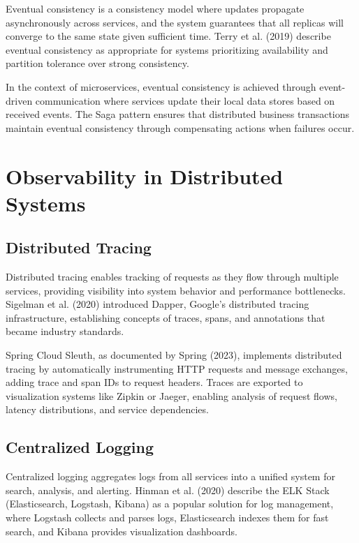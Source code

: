 Eventual consistency is a consistency model where updates propagate asynchronously across services, and the system guarantees that all replicas will converge to the same state given sufficient time. Terry et al. (2019) describe eventual consistency as appropriate for systems prioritizing availability and partition tolerance over strong consistency.

In the context of microservices, eventual consistency is achieved through event-driven communication where services update their local data stores based on received events. The Saga pattern ensures that distributed business transactions maintain eventual consistency through compensating actions when failures occur.

\section{Observability in Distributed Systems}

\subsection{Distributed Tracing}

Distributed tracing enables tracking of requests as they flow through multiple services, providing visibility into system behavior and performance bottlenecks. Sigelman et al. (2020) introduced Dapper, Google's distributed tracing infrastructure, establishing concepts of traces, spans, and annotations that became industry standards.

Spring Cloud Sleuth, as documented by Spring (2023), implements distributed tracing by automatically instrumenting HTTP requests and message exchanges, adding trace and span IDs to request headers. Traces are exported to visualization systems like Zipkin or Jaeger, enabling analysis of request flows, latency distributions, and service dependencies.

\subsection{Centralized Logging}

Centralized logging aggregates logs from all services into a unified system for search, analysis, and alerting. Hinman et al. (2020) describe the ELK Stack (Elasticsearch, Logstash, Kibana) as a popular solution for log management, where Logstash collects and parses logs, Elasticsearch indexes them for fast search, and Kibana provides visualization dashboards.

